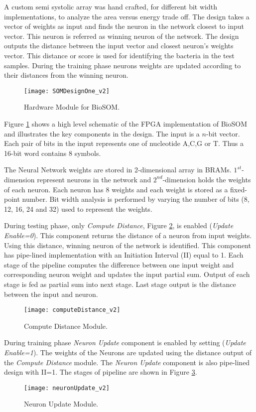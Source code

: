 A custom semi systolic array was hand crafted, for different bit width implementations, to analyze the area versus energy trade off. The design takes a vector of weights as input and finds the neuron in the network closest to input vector. This neuron is referred as winning neuron of the network. The design outputs the distance between the input vector and closest neuron's weights vector. This distance or score is used for identifying the bacteria in the test samples. During the training phase neurons weights are updated according to their distances from the winning neuron.
\begin{figure}[h]
	\captionsetup{font=sf}
	\texttt{[image: SOMDesignOne\_v2]}
	\caption{Hardware Module for BioSOM.}
	\label{fig:SOMFPGAImplementation}
\end{figure}
Figure \ref{fig:SOMFPGAImplementation} shows a high level schematic of the FPGA implementation of BioSOM and illustrates the key components in the design. The input is a $n$-bit vector. Each pair of bits in the input represents one of nucleotide A,C,G or T. Thus a 16-bit word contains 8 symbols. 

The Neural Network weights are stored in 2-dimensional array in BRAMs. $1^{st}$-dimension represent neurons in the network and $2^{nd}$-dimension holds the weights of each neuron. Each neuron has 8 weights and each weight is stored as a fixed-point number. Bit width analysis is performed by varying the number of bits (8, 12, 16, 24 and 32) used to represent the weights.

During testing phase, only \textit{Compute Distance}, Figure \ref{fig:ComputeDistance}, is enabled (\textit{Update Enable=0}). This component returns the distance of a neuron from input weights. Using this distance, winning neuron of the network is identified.
This component has pipe-lined implementation with an Initiation Interval (II) equal to 1. Each stage of the pipeline computes the difference between one input weight and corresponding neuron weight and updates the input partial sum. Output of each stage is fed as partial sum into next stage. Last stage output is the distance between the input and neuron.
\begin{figure}[h]
	\texttt{[image: computeDistance\_v2]}
	\caption{Compute Distance Module.}
	\label{fig:ComputeDistance}
\end{figure}

During training phase \textit{Neuron Update} component is enabled by setting (\textit{Update Enable=1}). The weights of the Neurons are updated using the distance output of the \textit{Compute Distance} module. The \textit{Neuron Update} component is also pipe-lined design with II=1. The stages of pipeline are shown in Figure \ref{fig:NeuronUpdate}.
\begin{figure}[h]
	\texttt{[image: neuronUpdate\_v2]}
	\caption{Neuron Update Module.}
	\label{fig:NeuronUpdate}
\end{figure}

